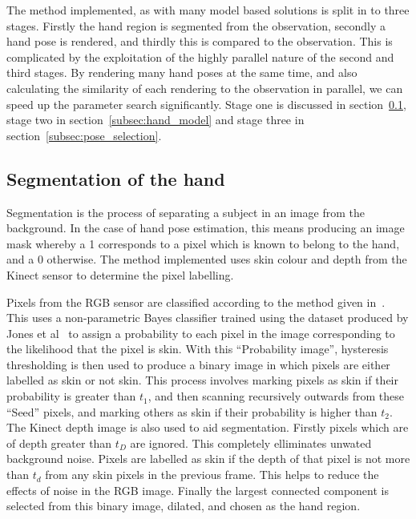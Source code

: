 \documentclass[10pt,a4paper,notitlepage,twocolumn]{report}
\begin{document}
The method implemented, as with many model based solutions is split in to three stages.  Firstly the hand region is segmented from the observation, secondly a hand pose is rendered, and thirdly this is compared to the observation.  This is complicated by the exploitation of the highly parallel nature of the second and third stages.  By rendering many hand poses at the same time, and also calculating the similarity of each rendering to the observation in parallel, we can speed up the parameter search significantly.  Stage one is discussed in section~\ref{subsec:segmentation}, stage two in section~\ref{subsec:hand_model} and stage three in section~\ref{subsec:pose_selection}.

  \subsection{Segmentation of the hand}
  \label{subsec:segmentation}

  Segmentation is the process of separating a subject in an image from the background.  In the case of hand pose estimation, this means producing an image mask whereby a 1 corresponds to a pixel which is known to belong to the hand, and a 0 otherwise.  The method implemented uses skin colour and depth from the Kinect sensor to determine the pixel labelling.  
  
  Pixels from the RGB sensor are classified according to the method given
  in~\cite{argyros2004real-timetracking}.  This uses a non-parametric Bayes
  classifier trained using the dataset produced by Jones et
  al~\cite{jones2002statisticalcolor} to assign a probability to each pixel in
  the image corresponding to the likelihood that the pixel is skin.  With this
  ``Probability image'', hysteresis thresholding is then used to produce a
  binary image in which pixels are either labelled as skin or not skin.  This
  process involves marking pixels as skin if their probability is greater than
  $t_1$, and then scanning recursively outwards from these ``Seed'' pixels, and
  marking others as skin if their probability is higher than $t_2$.  The Kinect
  depth image is also used to aid segmentation.  Firstly pixels which are of
  depth greater than $t_D$ are ignored.  This completely elliminates unwated
  background noise.  Pixels are labelled as skin if the depth of that pixel is
  not more than $t_d$ from any skin pixels in the previous frame.  This helps
  to reduce the effects of noise in the RGB image.  Finally the largest
  connected component is selected from this binary image, dilated, and chosen
  as the hand region.
\end{document}
